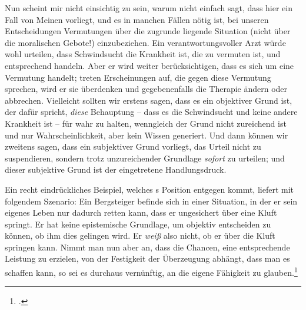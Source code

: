 \begin{nummerierung}
Nun scheint mir nicht einsichtig zu sein, warum  nicht
einfach sagt, dass hier ein Fall von Meinen vorliegt, und es in manchen Fällen
nötig ist, bei unseren Entscheidungen Vermutungen über die zugrunde liegende
Situation (nicht über die moralischen Gebote!) einzubeziehen. Ein
verantwortungsvoller Arzt würde wohl urteilen, dass Schwindsucht die Krankheit
ist, die zu vermuten ist, und entsprechend handeln. Aber er wird weiter
berücksichtigen, dass es sich um eine Vermutung handelt; treten Erscheinungen
auf, die gegen diese Vermutung sprechen, wird er sie überdenken und
gegebenenfalls die Therapie ändern oder abbrechen. Vielleicht sollten wir
erstens sagen, dass es ein objektiver Grund ist, der dafür spricht, \emph{diese} Behauptung --
dass es die Schwindsucht und keine andere Krankheit ist -- für wahr zu halten,
wenngleich der Grund nicht zureichend ist und nur Wahrscheinlichkeit, aber kein
Wissen generiert. Und dann können wir zweitens sagen, dass ein subjektiver
Grund vorliegt, das Urteil nicht zu suspendieren, sondern trotz unzureichender
Grundlage \emph{sofort} zu urteilen; und dieser subjektive Grund ist der
eingetretene Handlungsdruck.

Ein recht eindrückliches Beispiel, welches s Position
entgegen kommt, liefert  mit folgendem
Szenario: Ein Bergsteiger befinde sich in einer Situation, in der er sein eigenes Leben nur
dadurch retten kann, dass er ungesichert über eine Kluft springt. Er hat keine
epistemische Grundlage, um objektiv entscheiden zu können, ob ihm dies gelingen
wird. Er \emph{weiß} also nicht, ob er über die Kluft springen kann. Nimmt man
nun aber an, dass die Chancen, eine entsprechende Leistung zu erzielen, von der
Festigkeit der Überzeugung abhängt, dass man es schaffen kann, so sei es
durchaus vernünftig, an die eigene Fähigkeit zu
glauben.\footcite[Vgl.][\pno~343\,f.]{Chignell:BeliefinKant2007}


\end{nummerierung}

